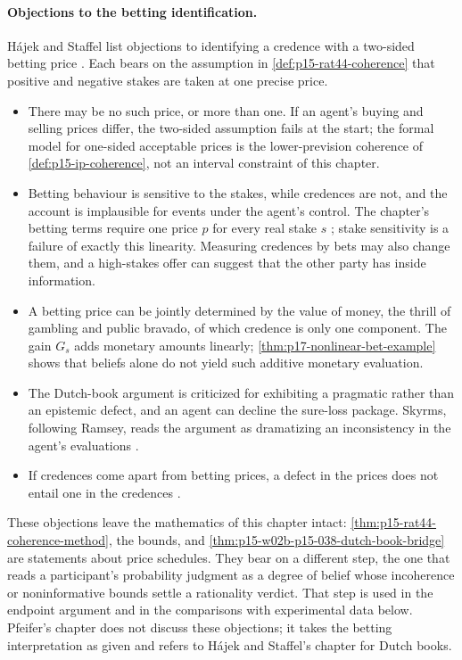\paragraph{Objections to the betting identification.}
H\'ajek and Staffel list objections to identifying a credence with a
two-sided betting price \cite[p.~240]{HajekStaffel2021Dynamics}. Each
bears on the assumption in \cref{def:p15-rat44-coherence} that positive
and negative stakes are taken at one precise price.
\begin{itemize}
\item There may be no such price, or more than one. If an agent's
      buying and selling prices differ, the two-sided assumption fails
      at the start; the formal model for one-sided acceptable prices
      is the lower-prevision coherence of \cref{def:p15-ip-coherence},
      not an interval constraint of this chapter.
\item Betting behaviour is sensitive to the stakes, while credences
      are not, and the account is implausible for events under the
      agent's control. The chapter's betting terms require one price
      \(p\) for every real stake \(s\)
      \cite[p.~282, note~3]{Pfeifer2021ProbabilityLogic}; stake
      sensitivity is a failure of exactly this linearity. Measuring
      credences by bets may also change them, and a high-stakes offer
      can suggest that the other party has inside information.
\item A betting price can be jointly determined by the value of money,
      the thrill of gambling and public bravado, of which credence is
      only one component. The gain \(G_s\) adds monetary amounts
      linearly; \cref{thm:p17-nonlinear-bet-example} shows that
      beliefs alone do not yield such additive monetary evaluation.
\item The Dutch-book argument is criticized for exhibiting a pragmatic
      rather than an epistemic defect, and an agent can decline the
      sure-loss package. Skyrms, following Ramsey, reads the argument
      as dramatizing an inconsistency in the agent's evaluations
      \cite[p.~241]{HajekStaffel2021Dynamics}.
\item If credences come apart from betting prices, a defect in the
      prices does not entail one in the credences
      \cite[p.~241]{HajekStaffel2021Dynamics}.
\end{itemize}
These objections leave the mathematics of this chapter intact:
\cref{thm:p15-rat44-coherence-method}, the bounds, and
\cref{thm:p15-w02b-p15-038-dutch-book-bridge} are statements about price
schedules. They bear on a different step, the one that reads a
participant's probability judgment as a degree of belief whose
incoherence or noninformative bounds settle a rationality verdict. That
step is used in the endpoint argument and in the comparisons with
experimental data below. Pfeifer's chapter does not discuss these
objections; it takes the betting interpretation as given and refers to
H\'ajek and Staffel's chapter for Dutch books.

